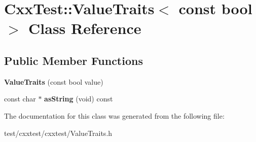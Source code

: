 \hypertarget{classCxxTest_1_1ValueTraits_3_01const_01bool_01_4}{\section{Cxx\-Test\-:\-:Value\-Traits$<$ const bool $>$ Class Reference}
\label{classCxxTest_1_1ValueTraits_3_01const_01bool_01_4}
}
\subsection*{Public Member Functions}
\begin{DoxyCompactItemize}
\item 
\hypertarget{classCxxTest_1_1ValueTraits_3_01const_01bool_01_4_a5b96c0a136b357429f212632ca400b6f}{{\bfseries Value\-Traits} (const bool value)}\label{classCxxTest_1_1ValueTraits_3_01const_01bool_01_4_a5b96c0a136b357429f212632ca400b6f}

\item 
\hypertarget{classCxxTest_1_1ValueTraits_3_01const_01bool_01_4_a5eb09ffab658a64e672c0051d9b3dd89}{const char $\ast$ {\bfseries as\-String} (void) const }\label{classCxxTest_1_1ValueTraits_3_01const_01bool_01_4_a5eb09ffab658a64e672c0051d9b3dd89}

\end{DoxyCompactItemize}


The documentation for this class was generated from the following file\-:\begin{DoxyCompactItemize}
\item 
test/cxxtest/cxxtest/Value\-Traits.\-h\end{DoxyCompactItemize}
